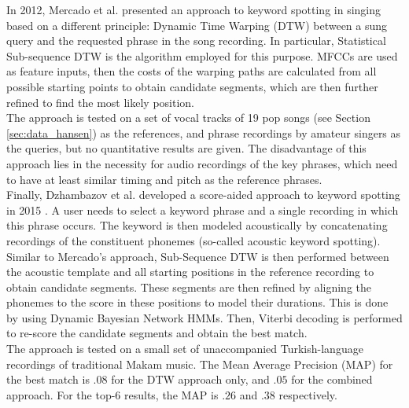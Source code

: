 \medskip
In 2012, Mercado et al. presented an approach to keyword spotting in singing based on a different principle: Dynamic Time Warping (DTW) between a sung query and the requested phrase in the song recording. In particular, Statistical Sub-sequence DTW is the algorithm employed for this purpose. MFCCs are used as feature inputs, then the costs of the warping paths are calculated from all possible starting points to obtain candidate segments, which are then further refined to find the most likely position.\\
The approach is tested on a set of vocal tracks of 19 pop songs (see Section \ref{sec:data_hansen}) as the references, and phrase recordings by amateur singers as the queries, but no quantitative results are given. The disadvantage of this approach lies in the necessity for audio recordings of the key phrases, which need to have at least similar timing and pitch as the reference phrases.\\
\medskip
Finally, Dzhambazov et al. developed a score-aided approach to keyword spotting in 2015 \cite{dzhambazov_ismir}. A user needs to select a keyword phrase and a single recording in which this phrase occurs. The keyword is then modeled acoustically by concatenating recordings of the constituent phonemes (so-called acoustic keyword spotting). Similar to Mercado's approach, Sub-Sequence DTW is then performed between the acoustic template and all starting positions in the reference recording to obtain candidate segments. These segments are then refined by aligning the phonemes to the score in these positions to model their durations. This is done by using Dynamic Bayesian Network HMMs. Then, Viterbi decoding is performed to re-score the candidate segments and obtain the best match.\\
The approach is tested on a small set of unaccompanied Turkish-language recordings of traditional Makam music. The Mean Average Precision (MAP) for the best match is $.08$ for the DTW approach only, and $.05$ for the combined approach. For the top-6 results, the MAP is $.26$ and $.38$ respectively.


